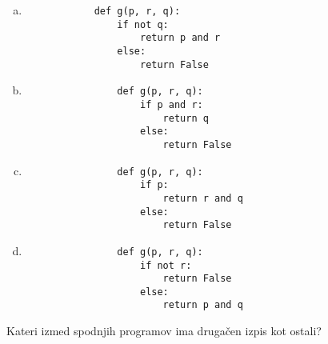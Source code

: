 \documentclass[arhiv, 10pt]{../izpit}
\begin{document}
        \begin{multicols}{2}
        \begin{enumerate}[(a)]
\item 
            \begin{verbatim}
            def g(p, r, q):
                if not q:
                    return p and r
                else:
                    return False
            \end{verbatim}
        
\item 
                \begin{verbatim}
                def g(p, r, q):
                    if p and r:
                        return q
                    else:
                        return False
                \end{verbatim}
            
\item 
                \begin{verbatim}
                def g(p, r, q):
                    if p:
                        return r and q
                    else:
                        return False
                \end{verbatim}
            
\item 
                \begin{verbatim}
                def g(p, r, q):
                    if not r:
                        return False
                    else:
                        return p and q
                \end{verbatim}
            
\end{enumerate}

        \end{multicols}
    
        \naloga*
        
        Kateri izmed spodnjih programov ima drugačen izpis kot ostali?
    
\end{document}
